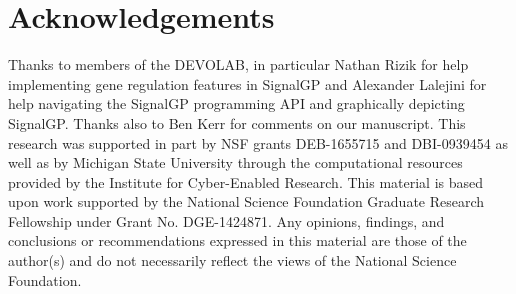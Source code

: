 \section{Acknowledgements}

Thanks to members of the DEVOLAB, in particular Nathan Rizik for help implementing gene regulation features in SignalGP and Alexander Lalejini for help navigating the SignalGP programming API and graphically depicting SignalGP.
Thanks also to Ben Kerr for comments on our manuscript.
This research was supported in part by NSF grants DEB-1655715 and DBI-0939454 as well as by Michigan State University through the computational resources provided by the Institute for Cyber-Enabled Research.
This material is based upon work supported by the National Science Foundation Graduate Research Fellowship under Grant No. DGE-1424871.
Any opinions, findings, and conclusions or recommendations expressed in this material are those of the author(s) and do not necessarily reflect the views of the National Science Foundation.

